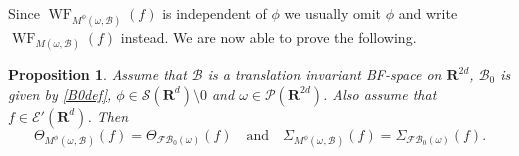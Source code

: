 \documentclass[12pt,a4paper,reqno]{amsart}
\numberwithin{equation}{section}
\numberwithin{thm}{section}
\newtheorem{prop}[thm]{Proposition}
\theoremstyle{definition}
\theoremstyle{remark}
\begin{document}
\par

Since ${\operatorname{WF}}_{M^\phi(\omega,\mathscr B)} (f)$ is independent of $\phi$ we usually omit $\phi$ and write ${\operatorname{WF}}_{M(\omega,\mathscr B)} (f)$ instead. We are now able to prove the following.

\par

\begin{prop}\label{theta-sigma}
Assume that $\mathscr B$ is a translation invariant BF-space on ${\mathbf R^{{2d}}}$, $\mathscr B_0$ is given by \eqref{B0def}, $\phi\in \mathscr S ({\mathbf R^{d}}) {\setminus {0}}$ and
$\omega \in \mathscr P({\mathbf R^{{2d}}})$. Also assume that $f\in
\mathscr E'({\mathbf R^{{ d}}})$. Then
\begin{equation}\label{fy-invariant2}
\Theta_{{M^{{\phi}}(\omega _{{}},\mathscr{B}^{{}})}} (f) = \Theta_{\mathscr{FB}_0
(\omega )} (f)\quad \text{and}\quad
\Sigma_{{M^{{\phi}}(\omega _{{}},\mathscr{B}^{{}})}}  (f) = \Sigma_{\mathscr{FB}_0(\omega )} (f).
\end{equation}
\end{prop}

\par
\end{document}
